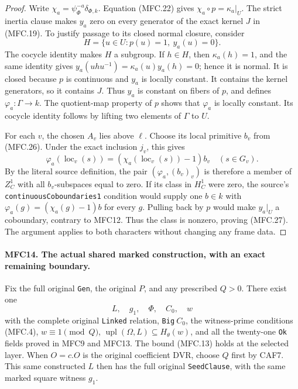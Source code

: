 \begin{proof}
Write \(\chi_a=\psi_\Phi^{-a}\delta_{\Phi,k}\).
Equation (MFC.22) gives \(\chi_a\circ p=\kappa_a|_U\).
The strict inertia clause makes \(y_a\) zero on every
generator of the exact kernel \(J\) in (MFC.19).
To justify passage to its closed normal closure, consider
\[
                    H=\{u\in U:p(u)=1,\ y_a(u)=0\}.
\]
The cocycle identity makes \(H\) a subgroup.  If \(h\in H\),
then \(\kappa_a(h)=1\), and the same identity gives
\(y_a(uhu^{-1})=\kappa_a(u)y_a(h)=0\); hence it is normal.
It is closed because \(p\) is continuous and \(y_a\) is
locally constant.  It contains the kernel generators, so it
contains \(J\).  Thus \(y_a\) is constant on fibers of
\(p\), and defines \(\varphi_a:\Gamma\to k\).
The quotient-map property of \(p\) shows that
\(\varphi_a\) is locally constant.  Its cocycle identity
follows by lifting two elements of \(\Gamma\) to \(U\).

For each \(v\), the chosen \(A_v\) lies above \(\ell\).
Choose its local primitive \(b_v\) from (MFC.26).  Under
the exact inclusion \(j_v\), this gives
\[
 \varphi_a(\operatorname{loc}_v(s))
      =(\chi_a(\operatorname{loc}_v(s))-1)b_v
                                  \quad(s\in G_v).        \tag{MFC.28}
\]
By the literal source definition, the pair
\((\varphi_a,(b_v)_v)\) is therefore a member of
\(Z^1_C\) with all \(b_v\)-subspaces equal to zero.
If its class in \(H^1_C\) were zero, the source's
\texttt{continuousCoboundaries1} condition would supply one
\(b\in k\) with
\(\varphi_a(g)=(\chi_a(g)-1)b\) for every \(g\).
Pulling back by \(p\) would make \(y_a|_U\) a coboundary,
contrary to MFC12.  Thus the class is nonzero, proving (MFC.27).
The argument applies to both characters without changing any
frame data.
\end{proof}

\paragraph{MFC14. The actual shared marked construction, with an exact remaining boundary.}
\label{claim:MFC14}
Fix the full original \texttt{Gen}, the original \(P\), and
any prescribed \(Q>0\).  There exist one
\[
                  L,\quad g_1,\quad\Phi,\quad C_0,\quad w
\]
with the complete original \texttt{Linked} relation,
\texttt{Big}\(\ C_0\), the witness-prime conditions
(MFC.4), \(w\equiv1\pmod Q\),
\(\operatorname{upl}(\Omega,L)\subseteq H_\theta(w)\),
and all the twenty-one \texttt{Ok} fields proved in MFC9
and MFC13.  The bound (MFC.13) holds at the selected layer.
When \(O=c.O\) is the original coefficient DVR, choose
\(Q\) first by CAF7.  This same constructed \(L\) then
has the full original \texttt{SeedClause}, with the same
marked square witness \(g_1\).

